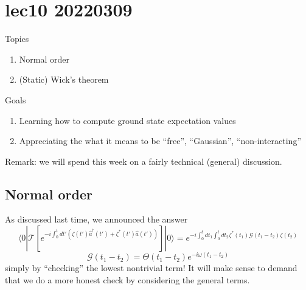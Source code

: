 \chapter{lec10 20220309}

Topics

\begin{enumerate}
    \item Normal order
    \item (Static) Wick's theorem
\end{enumerate}

Goals

\begin{enumerate}
    \item Learning how to compute ground state expectation values
    \item Appreciating the what it means to be ``free'', ``Gaussian'', ``non-interacting''
\end{enumerate}

Remark: we will spend this week on a fairly technical (general) discussion.

\section{Normal order}

As discussed last time, we announced the answer
\[ \langle 0|\mathcal{T} \left[ e^{-i\int_0^t{dt'\left( \zeta \left( t' \right) \hat{a}^{\dagger}\left( t' \right) +\zeta ^*\left( t' \right) \hat{a}\left( t' \right) \right)}} \right] |0\rangle =e^{-i\int_0^t{dt_1\int_0^t{dt_2\zeta ^*\left( t_1 \right) \mathscr{G} \left( t_1-t_2 \right) \zeta \left( t_2 \right)}}}\]
\[ \mathscr{G} \left( t_1-t_2 \right) =\Theta \left( t_1-t_2 \right) e^{-i\omega \left( t_1-t_2 \right)}\]
simply by ``checking'' the lowest nontrivial term! It will make sense to demand that we do a more honest check by considering the general terms.


